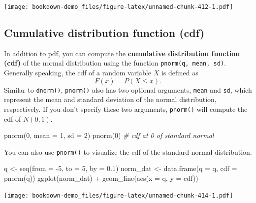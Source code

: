 \documentclass[
]{book}
\newenvironment{Shaded}{\begin{snugshade}}{\end{snugshade}}
\newcommand{\AttributeTok}[1]{\textcolor[rgb]{0.77,0.63,0.00}{#1}}
\newcommand{\CommentTok}[1]{\textcolor[rgb]{0.56,0.35,0.01}{\textit{#1}}}
\newcommand{\DecValTok}[1]{\textcolor[rgb]{0.00,0.00,0.81}{#1}}
\newcommand{\FloatTok}[1]{\textcolor[rgb]{0.00,0.00,0.81}{#1}}
\newcommand{\FunctionTok}[1]{\textcolor[rgb]{0.00,0.00,0.00}{#1}}
\newcommand{\NormalTok}[1]{#1}
\newcommand{\OtherTok}[1]{\textcolor[rgb]{0.56,0.35,0.01}{#1}}
\newcommand{\SpecialCharTok}[1]{\textcolor[rgb]{0.00,0.00,0.00}{#1}}
\begin{document}
\texttt{[image: bookdown-demo\_files/figure-latex/unnamed-chunk-412-1.pdf]}

\hypertarget{cdf}{%
\subsection{Cumulative distribution function (cdf)}\label{cdf}}

In addition to pdf, you can compute the \textbf{cumulative distribution function (cdf)} of the normal distribution using the function \texttt{pnorm(q,\ mean,\ sd)}. Generally speaking, the cdf of a random variable \(X\) is defined as
\[F(x) = P(X\leq x).\] Similar to \texttt{dnorm()}, \texttt{pnorm()} also has two optional arguments, \texttt{mean} and \texttt{sd}, which represent the mean and standard deviation of the normal distribution, respectively. If you don't specify these two arguments, \texttt{pnorm()} will compute the cdf of \(N(0,1)\).

\begin{Shaded}
\begin{Highlighting}[]
\FunctionTok{pnorm}\NormalTok{(}\DecValTok{0}\NormalTok{, }\AttributeTok{mean =} \DecValTok{1}\NormalTok{, }\AttributeTok{sd =} \DecValTok{2}\NormalTok{)}
\FunctionTok{pnorm}\NormalTok{(}\DecValTok{0}\NormalTok{) }\CommentTok{\# cdf at 0 of standard normal}
\end{Highlighting}
\end{Shaded}

You can also use \texttt{pnorm()} to visualize the cdf of the standard normal distribution.

\begin{Shaded}
\begin{Highlighting}[]
\NormalTok{q }\OtherTok{\textless{}{-}} \FunctionTok{seq}\NormalTok{(}\AttributeTok{from =} \SpecialCharTok{{-}}\DecValTok{5}\NormalTok{, }\AttributeTok{to =} \DecValTok{5}\NormalTok{, }\AttributeTok{by =} \FloatTok{0.1}\NormalTok{)}
\NormalTok{norm\_dat }\OtherTok{\textless{}{-}} \FunctionTok{data.frame}\NormalTok{(}\AttributeTok{q =}\NormalTok{ q, }\AttributeTok{cdf =} \FunctionTok{pnorm}\NormalTok{(q))}
\FunctionTok{ggplot}\NormalTok{(norm\_dat) }\SpecialCharTok{+} \FunctionTok{geom\_line}\NormalTok{(}\FunctionTok{aes}\NormalTok{(}\AttributeTok{x =}\NormalTok{ q, }\AttributeTok{y =}\NormalTok{ cdf))}
\end{Highlighting}
\end{Shaded}

\texttt{[image: bookdown-demo\_files/figure-latex/unnamed-chunk-414-1.pdf]}
\end{document}
